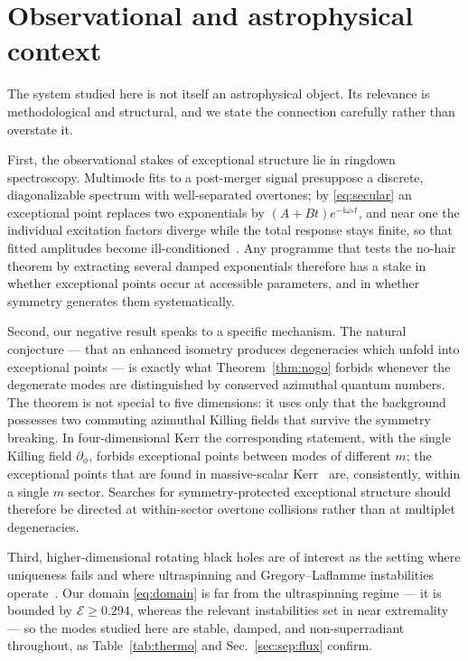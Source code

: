 \documentclass[aps,prd,reprint,superscriptaddress,nofootinbib,longbibliography]{revtex4-2}
\theoremstyle{plain}
\theoremstyle{definition}
\theoremstyle{remark}
\newcommand{\ii}{\mathrm{i}}
\begin{document}
\section{Observational and astrophysical context}\label{sec:astro}

The system studied here is not itself an astrophysical object. Its relevance is
methodological and structural, and we state the connection carefully rather than
overstate it.

First, the observational stakes of exceptional structure lie in ringdown
spectroscopy. Multimode fits to a post-merger signal presuppose a discrete,
diagonalizable spectrum with well-separated overtones; by \eqref{eq:secular} an
exceptional point replaces two exponentials by $(A+Bt)e^{-\ii\omega_*t}$, and
near one the individual excitation factors diverge while the total response
stays finite, so that fitted amplitudes become
ill-conditioned~\cite{Motohashi2024B24,Oshita2025B25,Kubota2025B27}. Any
programme that tests the no-hair theorem by extracting several damped
exponentials therefore has a stake in whether exceptional points occur at
accessible parameters, and in whether symmetry generates them systematically.

Second, our negative result speaks to a specific mechanism. The natural
conjecture --- that an enhanced isometry produces degeneracies which unfold into
exceptional points --- is exactly what Theorem~\ref{thm:nogo} forbids whenever
the degenerate modes are distinguished by conserved azimuthal quantum numbers.
The theorem is not special to five dimensions: it uses only that the background
possesses two commuting azimuthal Killing fields that survive the symmetry
breaking. In four-dimensional Kerr the corresponding statement, with the single
Killing field $\partial_\phi$, forbids exceptional points between modes of
different $m$; the exceptional points that are found in massive-scalar
Kerr~\cite{Cavalcante2024B22,Cavalcante2024B23} are, consistently,
within a single $m$ sector. Searches for symmetry-protected exceptional
structure should therefore be directed at within-sector overtone collisions
rather than at multiplet degeneracies.

Third, higher-dimensional rotating black holes are of interest as the setting
where uniqueness fails and where ultraspinning and Gregory--Laflamme
instabilities operate~\cite{Diasetal2010A07,Emparan2014A08}. Our domain
\eqref{eq:domain} is far from the ultraspinning regime --- it is bounded by
$\mathcal{E}\ge0.294$, whereas the relevant instabilities set in near
extremality --- so the modes studied here are stable, damped, and non-superradiant
throughout, as Table~\ref{tab:thermo} and Sec.~\ref{sec:sep:flux} confirm.
\end{document}

